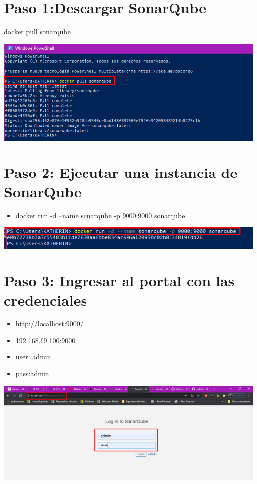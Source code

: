 \section{Paso 1:Descargar SonarQube} 
docker pull sonarqube
\begin{center}
\includegraphics[width=\columnwidth]{images/1}\newline
\end{center}
\section{Paso 2: Ejecutar una instancia de SonarQube } 
\begin{itemize}
    \item docker run -d --name sonarqube -p 9000:9000 sonarqube
\end{itemize}
\begin{center}
\includegraphics[width=\columnwidth]{images/2}\newline
\end{center}
\section{Paso 3: Ingresar al portal con las credenciales } 
\begin{itemize}
    \item http://localhost:9000/
    \item 192.168.99.100:9000
    \item user: admin
    \item pass:admin
\end{itemize}
\begin{center}
\includegraphics[width=\columnwidth]{images/3}\newline
\end{center}
